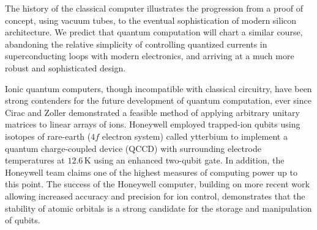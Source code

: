 \documentclass[12pt,a4paper]{amsart}
\numberwithin{equation}{section}
\theoremstyle{plain}
\theoremstyle{definition}
\begin{document}
The history of the classical computer illustrates the progression from a proof of concept, using vacuum tubes, to the eventual sophistication of modern silicon architecture. We predict that quantum computation will chart a similar course, abandoning the relative simplicity of controlling quantized currents in superconducting loops with modern electronics, and arriving at a much more robust and sophisticated design.


Ionic quantum computers, though incompatible with classical circuitry, have been strong contenders for the future development of quantum computation, ever since Cirac and Zoller demonstrated a feasible method of applying arbitrary unitary matrices to linear arrays of ions. \cite{fundQuanIoni} Honeywell employed  trapped-ion qubits using isotopes of rare-earth ($4f$ electron system) called ytterbium  \cite{rareEartFund} to implement a quantum charge-coupled device (QCCD) with surrounding electrode temperatures at $12.6\,$K using an enhanced two-qubit gate. In addition, the Honeywell team claims one of the highest measures of computing power up to this point.\cite{honeywell} The success of the Honeywell computer, building on more recent work allowing increased accuracy and precision for ion control, demonstrates that the stability of atomic orbitals is a strong candidate for the storage and manipulation of qubits.
\end{document}
